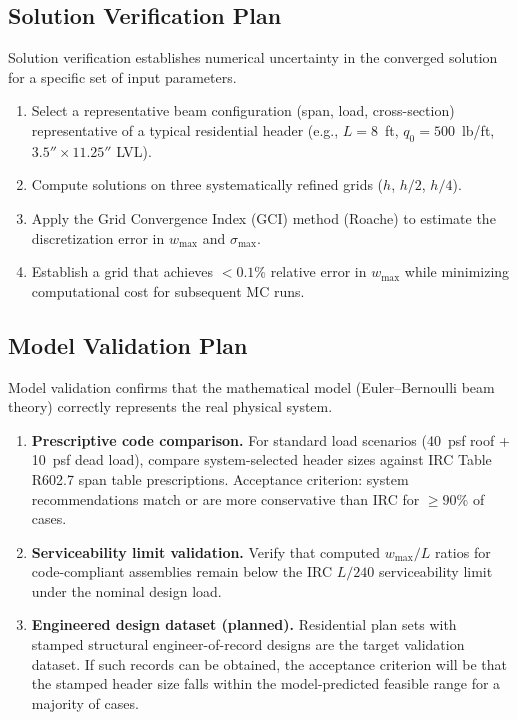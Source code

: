 \subsection{Solution Verification Plan}

Solution verification establishes numerical uncertainty in the converged solution for a specific set of input parameters.

\begin{enumerate}
  \item Select a representative beam configuration (span, load, cross-section) representative of a typical residential header (e.g., $L = 8$~ft, $q_0 = 500$~lb/ft, $3.5'' \times 11.25''$ LVL).
  \item Compute solutions on three systematically refined grids ($h$, $h/2$, $h/4$).
  \item Apply the Grid Convergence Index (GCI) method (Roache) to estimate the discretization error in $w_{\max}$ and $\sigma_{\max}$.
  \item Establish a grid that achieves $< 0.1\%$ relative error in $w_{\max}$ while minimizing computational cost for subsequent MC runs.
\end{enumerate}

\subsection{Model Validation Plan}

Model validation confirms that the mathematical model (Euler--Bernoulli beam theory) correctly represents the real physical system.

\begin{enumerate}
  \item \textbf{Prescriptive code comparison.}
  For standard load scenarios (40~psf roof + 10~psf dead load), compare system-selected header sizes against IRC Table R602.7 span table prescriptions.
  Acceptance criterion: system recommendations match or are more conservative than IRC for $\geq 90\%$ of cases.

  \item \textbf{Serviceability limit validation.}
  Verify that computed $w_{\max}/L$ ratios for code-compliant assemblies remain below the IRC $L/240$ serviceability limit under the nominal design load.

  \item \textbf{Engineered design dataset (planned).}
  Residential plan sets with stamped structural engineer-of-record designs are the target validation dataset.
  If such records can be obtained, the acceptance criterion will be that the stamped header size falls within the model-predicted feasible range for a majority of cases.
\end{enumerate}

